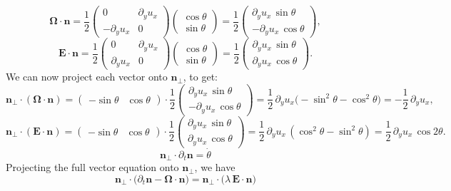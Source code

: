 \documentclass[11pt]{article}
\begin{document}
$$\boldsymbol{\Omega}\!\cdot\!\mathbf{n} = \frac{1}{2} \begin{pmatrix} 0 & \partial_y u_x\\[4pt] -\partial_y u_x & 0 \end{pmatrix} \begin{pmatrix} \cos\theta\\[2pt] \sin\theta \end{pmatrix} = \frac{1}{2} \begin{pmatrix} \partial_y u_x \,\sin\theta\\[4pt] -\partial_y u_x \,\cos\theta \end{pmatrix},$$
$$\mathbf{E}\!\cdot\!\mathbf{n} = \frac{1}{2} \begin{pmatrix} 0 & \partial_y u_x\\[4pt] \partial_y u_x & 0 \end{pmatrix} \begin{pmatrix} \cos\theta\\[2pt] \sin\theta \end{pmatrix} = \frac{1}{2} \begin{pmatrix} \partial_y u_x \,\sin\theta\\[4pt] \partial_y u_x \,\cos\theta \end{pmatrix}.$$
We can now project each vector onto $\mathbf{n}_\perp$, to get:
$$\mathbf{n}_\perp\!\cdot\!(\boldsymbol{\Omega}\!\cdot\!\mathbf{n}) =\begin{pmatrix} -\sin\theta & \cos\theta \end{pmatrix} \cdot \frac{1}{2} \begin{pmatrix} \partial_y u_x \,\sin\theta\\[4pt] -\partial_y u_x \,\cos\theta \end{pmatrix} = \frac{1}{2}\,\partial_y u_x \big(-\sin^2\theta - \cos^2\theta\big) = -\frac{1}{2}\,\partial_y u_x,$$
$$\mathbf{n}_\perp\!\cdot\!(\mathbf{E}\!\cdot\!\mathbf{n}) =\begin{pmatrix} -\sin\theta & \cos\theta \end{pmatrix} \cdot \frac{1}{2} \begin{pmatrix} \partial_y u_x \,\sin\theta\\[4pt] \partial_y u_x \,\cos\theta \end{pmatrix} = \frac{1}{2}\,\partial_y u_x\,(\cos^2\theta - \sin^2\theta) = \frac{1}{2}\,\partial_y u_x\,\cos 2\theta.$$
$$\mathbf{n}_\perp\!\cdot\!\partial_t\mathbf{n} = \dot\theta$$
Projecting the full vector equation onto $\mathbf{n_{\perp}}$, we have
$$\mathbf{n}_\perp\!\cdot\!\big(\partial_t\mathbf{n} - \boldsymbol{\Omega}\!\cdot\!\mathbf{n}\big) = \mathbf{n}_\perp\!\cdot\!\big(\lambda\,\mathbf{E}\!\cdot\!\mathbf{n}\big)$$
\end{document}
